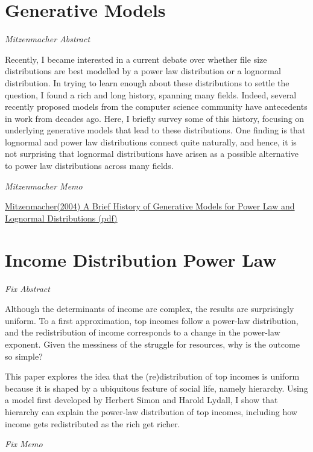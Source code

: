 \documentclass[
]{book}
\begin{document}
\hypertarget{generative-models}{%
\section{Generative Models}\label{generative-models}}

\emph{Mitzenmacher Abstract}

Recently, I became interested in a current debate over whether file size
distributions are best modelled by a power law distribution or a lognormal distribution.
In trying to learn enough about these distributions to settle the question, I found a rich
and long history, spanning many fields. Indeed, several recently proposed models from
the computer science community have antecedents in work from decades ago. Here,
I briefly survey some of this history, focusing on underlying generative models that
lead to these distributions. One finding is that lognormal and power law distributions
connect quite naturally, and hence, it is not surprising that lognormal distributions
have arisen as a possible alternative to power law distributions across many fields.

\emph{Mitzenmacher Memo}

\href{pdf/Mitzenmacher_2004_Generative_Models_Power_Law.pdf}{Mitzenmacher(2004) A Brief History of Generative Models for Power Law and Lognormal Distributions (pdf)}

\hypertarget{income-distribution-power-law}{%
\section{Income Distribution Power Law}\label{income-distribution-power-law}}

\emph{Fix Abstract}

Although the determinants of income are complex, the results are surprisingly uniform. To a first approximation, top incomes follow a power-law distribution, and the redistribution of income corresponds to a change in the power-law exponent. Given the messiness of the struggle for resources, why is the outcome so simple?

This paper explores the idea that the (re)distribution of top incomes is uniform because it is shaped by a ubiquitous feature of social life, namely hierarchy. Using a model first developed by Herbert Simon and Harold Lydall, I show that hierarchy can explain the power-law distribution of top incomes, including how income gets redistributed as the rich get richer.

\emph{Fix Memo}
\end{document}
